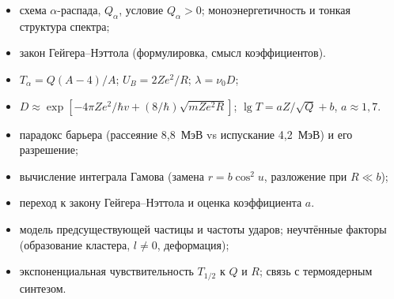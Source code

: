 \begin{examcheck}
\begin{itemize}
 \item схема $\alpha$-распада, $Q_\alpha$, условие $Q_\alpha>0$; моноэнергетичность и тонкая структура спектра;
 \item закон Гейгера--Нэттола (формулировка, смысл коэффициентов).
\end{itemize}
\begin{itemize}
 \item $T_\alpha=Q(A-4)/A$; $U_B=2Ze^2/R$; $\lambda=\nu_0D$;
 \item $D\approx\exp[-4\pi Ze^2/\hbar v+(8/\hbar)\sqrt{mZe^2R}]$; $\lg T=aZ/\sqrt Q+b$, $a\approx1{,}7$.
\end{itemize}
\begin{itemize}
 \item парадокс барьера (рассеяние 8,8~МэВ vs испускание 4,2~МэВ) и его разрешение;
 \item вычисление интеграла Гамова (замена $r=b\cos^2u$, разложение при $R\ll b$);
 \item переход к закону Гейгера--Нэттола и оценка коэффициента $a$.
\end{itemize}
\begin{itemize}
 \item модель предсуществующей частицы и частоты ударов; неучтённые факторы (образование кластера, $l\neq0$, деформация);
 \item экспоненциальная чувствительность $T_{1/2}$ к $Q$ и $R$; связь с термоядерным синтезом.
\end{itemize}
\end{examcheck}
